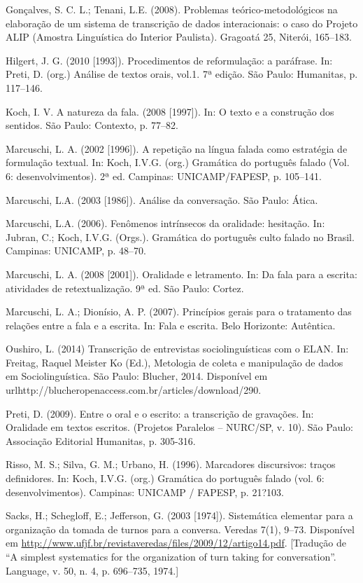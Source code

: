 \documentclass[a4paper,12pt]{article}
\begin{document}
{\begin{hangparas}{.25in}{1}
Gonçalves, S. C. L.; Tenani, L.E. (2008). Problemas teórico-metodológicos na elaboração de um sistema de transcrição de dados interacionais: o caso do Projeto ALIP (Amostra Linguística do Interior Paulista). Gragoatá 25, Niterói, 165--183.

Hilgert, J. G. (2010 [1993]). Procedimentos de reformulação: a paráfrase. In: Preti, D. (org.) Análise de textos orais, vol.1. 7ª edição. São Paulo: Humanitas, p. 117--146.  

Koch, I. V. A natureza da fala. (2008 [1997]). In: O texto e a construção dos sentidos. São Paulo: Contexto, p. 77--82.

Marcuschi, L. A. (2002 [1996]). A repetição na língua falada como estratégia de formulação textual. In: Koch, I.V.G. (org.) Gramática do português falado (Vol. 6: desenvolvimentos). 2ª ed. Campinas: UNICAMP/FAPESP, p. 105--141.

Marcuschi, L.A. (2003 [1986]). Análise da conversação. São Paulo: Ática.

Marcuschi, L.A. (2006). Fenômenos intrínsecos da oralidade: hesitação. In: Jubran, C.; Koch, I.V.G. (Orgs.). Gramática do português culto falado no Brasil. Campinas: UNICAMP, p. 48--70.

Marcuschi, L. A. (2008 [2001]). Oralidade e letramento. In: Da fala para a escrita: atividades de retextualização. 9ª ed. São Paulo: Cortez. 

Marcuschi, L. A.; Dionísio, A. P. (2007). Princípios gerais para o tratamento das relações entre a fala e a escrita. In: Fala e escrita. Belo Horizonte: Autêntica. 

Oushiro, L. (2014) Transcrição de entrevistas sociolinguísticas com o ELAN. 
In: Freitag, Raquel Meister Ko (Ed.), Metologia de coleta e manipulação de dados em Sociolinguística. São Paulo: Blucher, 2014. Disponível em url{http://blucheropenaccess.com.br/articles/download/290}.

Preti, D. (2009). Entre o oral e o escrito: a transcrição de gravações. In: Oralidade em textos escritos. (Projetos Paralelos -- NURC/SP, v. 10). São Paulo: Associação Editorial Humanitas, p. 305-316.

Risso, M. S.; Silva, G. M.; Urbano, H. (1996). Marcadores discursivos: traços definidores. In: Koch, I.V.G. (org.) Gramática do português falado (vol. 6: desenvolvimentos). Campinas: UNICAMP / FAPESP, p. 21?103.


Sacks, H.; Schegloff, E.; Jefferson, G. (2003 [1974]). Sistemática elementar para a organização da tomada de turnos para a conversa. Veredas 7(1), 9--73. Disponível em \url{http://www.ufjf.br/revistaveredas/files/2009/12/artigo14.pdf}. [Tradução de ``A simplest systematics for the organization of turn taking for conversation''. Language, v. 50, n. 4, p. 696--735, 1974.]


\end{hangparas}}
\end{document}

